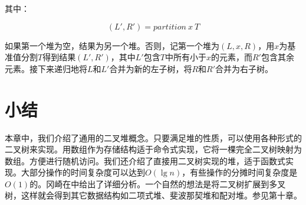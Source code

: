 \documentclass[b5paper]{ctexart}
\begin{document}
其中：

\[
  (L', R') = partition\ x\ T
\]

如果第一个堆为空，结果为另一个堆。否则，记第一个堆为$(L, x, R)$，用$x$为基准值分割$T$得到结果$(L', R')$，其中$L'$包含$T$中所有小于$x$的元素，而$R'$包含其余元素。接下来递归地将$L$和$L'$合并为新的左子树，将$R$和$R'$合并为右子树。

\section{小结}

本章中，我们介绍了通用的二叉堆概念。只要满足堆的性质，可以使用各种形式的二叉树来实现。用数组作为存储结构适于命令式实现，它将一棵完全二叉树映射为数组。方便进行随机访问。我们还介绍了直接用二叉树实现的堆，适于函数式实现。大部分操作的时间复杂度可以达到$O(\lg n)$，有些操作的分摊时间复杂度是$O(1)$的。冈崎在\cite{okasaki-book}中给出了详细分析。一个自然的想法是将二叉树扩展到多叉树，这样就会得到其它数据结构如二项式堆、斐波那契堆和配对堆。参见第十章。

\begin{Exercise}\label{ex:other-binary-heaps}
\end{Exercise}
\end{document}
